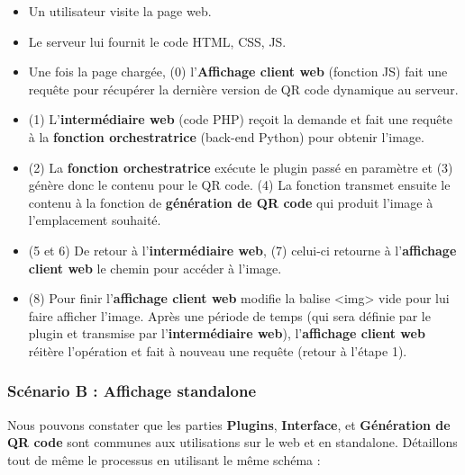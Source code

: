 \documentclass[a4paper,12pt]{article}
\begin{document}
\begin{itemize}
  
  \item Un utilisateur visite la page web.
  \item Le serveur lui fournit le code HTML, CSS, JS.
  \item Une fois la page chargée, (0) l'\textbf{Affichage client web} (fonction JS) fait une requête pour récupérer la dernière version de QR code dynamique au serveur.
  \item (1) L'\textbf{intermédiaire web} (code PHP) reçoit la demande et fait une requête à la \textbf{fonction orchestratrice} (back-end Python) pour obtenir l'image.
  \item (2) La \textbf{fonction orchestratrice} exécute le plugin passé en paramètre et (3) génère donc le contenu pour le QR code. (4) La fonction transmet ensuite le contenu à la fonction de \textbf{génération de QR code} qui produit l'image à l'emplacement souhaité.
  \item (5 et 6) De retour à l'\textbf{intermédiaire web}, (7) celui-ci retourne à l'\textbf{affichage client web} le chemin pour accéder à l'image.
  \item (8) Pour finir l'\textbf{affichage client web} modifie la balise <img> vide pour lui faire afficher l'image. Après une période de temps (qui sera définie par le plugin et transmise par l'\textbf{intermédiaire web}), l'\textbf{affichage client web} réitère l'opération et fait à nouveau une requête (retour à l'étape 1).
  
\end{itemize}

\subsubsection{Scénario B : Affichage standalone}
\label{scen:1B}

Nous pouvons constater que les parties \textbf{Plugins}, \textbf{Interface}, et \textbf{Génération de QR code} sont communes aux utilisations sur le web et en standalone. Détaillons tout de même le processus en utilisant le même schéma :\\
\end{document}
